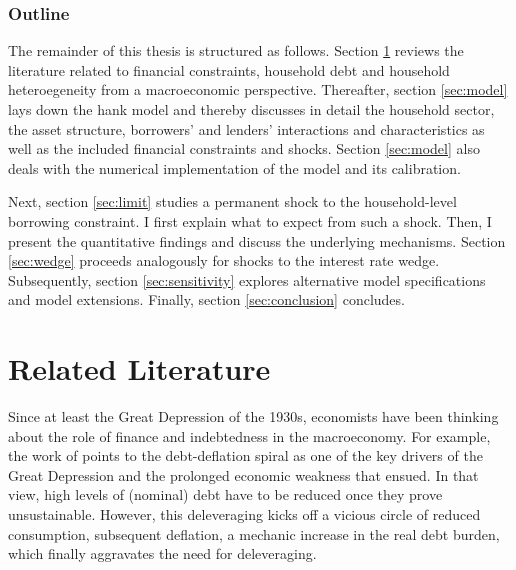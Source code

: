 \documentclass[12pt]{article} %
\numberwithin{equation}{section} %
\numberwithin{figure}{section}
\numberwithin{table}{section}
\begin{document}
\subsubsection*{Outline}
\label{sec:outline}
The remainder of this thesis is structured as follows. Section \ref{sec:literature} reviews the literature related to financial constraints, household debt and household heteroegeneity from a macroeconomic perspective. Thereafter, section \ref{sec:model} lays down the \Gls{hank} model and thereby discusses in detail the household sector, the asset structure, borrowers' and lenders' interactions and characteristics as well as the included financial constraints and shocks. Section \ref{sec:model} also deals with the numerical implementation of the model and its calibration. 

Next, section \ref{sec:limit} studies a permanent shock to the household-level borrowing constraint. I first explain what to expect from such a shock. Then, I present the quantitative findings and discuss the underlying mechanisms. Section \ref{sec:wedge} proceeds analogously for shocks to the interest rate wedge. Subsequently, section \ref{sec:sensitivity} explores alternative model specifications and model extensions. Finally, section \ref{sec:conclusion} concludes.

\section{Related Literature}
\label{sec:literature}

Since at least the Great Depression of the 1930s, economists have been thinking about the role of finance and indebtedness in the macroeconomy. For example, the work of \textcite{fisher1933} points to the debt-deflation spiral as one of the key drivers of the Great Depression and the prolonged economic weakness that ensued. In that view, high levels of (nominal) debt have to be reduced once they prove unsustainable. However, this deleveraging kicks off a vicious circle of reduced consumption, subsequent deflation, a mechanic increase in the real debt burden, which finally aggravates the need for deleveraging.
\end{document}
